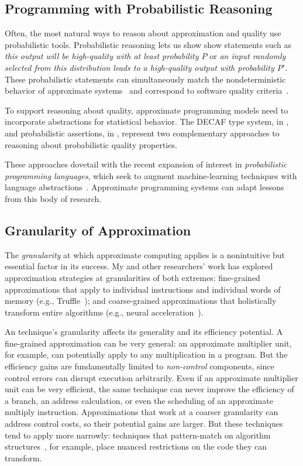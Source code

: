 \subsection{Programming with Probabilistic Reasoning}

Often, the most natural ways to reason about approximation and quality use
probabilistic tools.
Probabilistic reasoning lets us show show statements such as \emph{this output
will be high-quality with at least probability $P$} or \emph{an input randomly
selected from this distribution leads to a high-quality output with
probability $P'$}.
These probabilistic statements can simultaneously match the nondeterministic behavior
of approximate systems~\cite{truffle, npu, approxstorage}
and correspond to software quality criteria~\cite{decaf, passert}.

To support reasoning about quality, approximate
programming models need to incorporate abstractions for statistical behavior.
The DECAF type system, in , and
probabilistic assertions, in , represent two
complementary approaches to reasoning about probabilistic quality
properties.

These approaches dovetail with the recent expansion of interest in
\emph{probabilistic programming languages}, which seek to augment
machine-learning techniques with language abstractions~\cite{church}.
Approximate programming systems can adapt lessons from this body of research.

\subsection{Granularity of Approximation}
\label{sec:princ:granularity}

The \emph{granularity} at which approximate computing applies is a
nonintuitive but essential factor in its success.
My and other researchers' work has explored approximation strategies at
granularities of both extremes:
fine-grained approximations that apply to individual instructions and
individual words of memory (e.g., Truffle~\cite{truffle});
and coarse-grained approximations that holistically transform entire
algorithms (e.g., neural acceleration~\cite{npu}).

An technique's granularity affects its
generality and its efficiency potential.
A fine-grained approximation can be very general:
an approximate multiplier unit, for example, can potentially apply to any
multiplication in a program.
But the efficiency gains are fundamentally limited to \emph{non-control} components,
since control errors can disrupt execution arbitrarily.
Even if an approximate multiplier unit can be very efficient,
the same technique can never
improve the efficiency of a branch, an address calculation,
or even the
scheduling of an approximate multiply instruction.
Approximations that work at a coarser granularity can address control costs,
so their potential gains are larger.
But these techniques tend to apply more narrowly:
techniques that pattern-match on algorithm structures~\cite{paraprox},
for example, place nuanced restrictions on the code they can transform.

